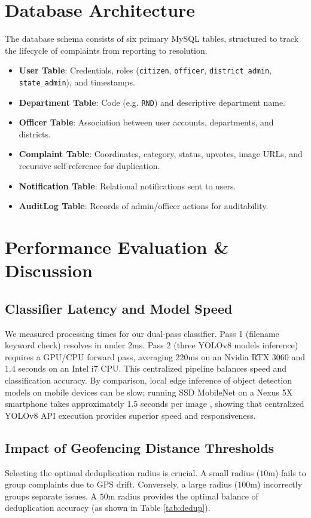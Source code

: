 \documentclass[journal]{IEEEtran}
\begin{document}
\section{Database Architecture}
The database schema consists of six primary MySQL tables, structured to track the lifecycle of complaints from reporting to resolution.
\begin{itemize}
    \item \textbf{User Table}: Credentials, roles (\texttt{citizen}, \texttt{officer}, \texttt{district\_admin}, \texttt{state\_admin}), and timestamps.
    \item \textbf{Department Table}: Code (e.g. \texttt{RND}) and descriptive department name.
    \item \textbf{Officer Table}: Association between user accounts, departments, and districts.
    \item \textbf{Complaint Table}: Coordinates, category, status, upvotes, image URLs, and recursive self-reference for duplication.
    \item \textbf{Notification Table}: Relational notifications sent to users.
    \item \textbf{AuditLog Table}: Records of admin/officer actions for auditability.
\end{itemize}

\section{Performance Evaluation \& Discussion}

\subsection{Classifier Latency and Model Speed}
We measured processing times for our dual-pass classifier. Pass 1 (filename keyword check) resolves in under 2ms. Pass 2 (three YOLOv8 models inference) requires a GPU/CPU forward pass, averaging 220ms on an Nvidia RTX 3060 and 1.4 seconds on an Intel i7 CPU. This centralized pipeline balances speed and classification accuracy. By comparison, local edge inference of object detection models on mobile devices can be slow; running SSD MobileNet on a Nexus 5X smartphone takes approximately 1.5 seconds per image \cite{b16}, showing that centralized YOLOv8 API execution provides superior speed and responsiveness.

\subsection{Impact of Geofencing Distance Thresholds}
Selecting the optimal deduplication radius is crucial. A small radius ($10\text{m}$) fails to group complaints due to GPS drift. Conversely, a large radius ($100\text{m}$) incorrectly groups separate issues. A $50\text{m}$ radius provides the optimal balance of deduplication accuracy (as shown in Table \ref{tab:dedup}).
\end{document}
